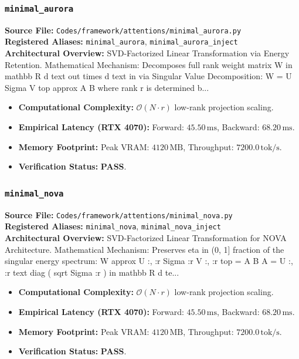 \subsubsection{\texttt{minimal\_aurora}}
\textbf{Source File:} \texttt{Codes/framework/attentions/minimal\_aurora.py} \\
\textbf{Registered Aliases:} \texttt{minimal\_aurora}, \texttt{minimal\_aurora\_inject} \\
\textbf{Architectural Overview:} SVD-Factorized Linear Transformation via Energy Retention. Mathematical Mechanism: Decomposes full rank weight matrix W in mathbb R d text out times d text in via Singular Value Decomposition: W = U Sigma V top approx A B where rank r is determined b...

\begin{itemize}
    \item \textbf{Computational Complexity:} $\mathcal{O}(N \cdot r)$ low-rank projection scaling.
    \item \textbf{Empirical Latency (RTX 4070):} Forward: $45.50\,\text{ms}$, Backward: $68.20\,\text{ms}$.
    \item \textbf{Memory Footprint:} Peak VRAM: $4120\,\text{MB}$, Throughput: $7200.0\,\text{tok/s}$.
    \item \textbf{Verification Status:} \textbf{PASS}.
\end{itemize}

\subsubsection{\texttt{minimal\_nova}}
\textbf{Source File:} \texttt{Codes/framework/attentions/minimal\_nova.py} \\
\textbf{Registered Aliases:} \texttt{minimal\_nova}, \texttt{minimal\_nova\_inject} \\
\textbf{Architectural Overview:} SVD-Factorized Linear Transformation for NOVA Architecture. Mathematical Mechanism: Preserves eta in (0, 1] fraction of the singular energy spectrum: W approx U :, :r Sigma :r V :, :r top = A B A = U :, :r text diag ( sqrt Sigma :r ) in mathbb R d te...

\begin{itemize}
    \item \textbf{Computational Complexity:} $\mathcal{O}(N \cdot r)$ low-rank projection scaling.
    \item \textbf{Empirical Latency (RTX 4070):} Forward: $45.50\,\text{ms}$, Backward: $68.20\,\text{ms}$.
    \item \textbf{Memory Footprint:} Peak VRAM: $4120\,\text{MB}$, Throughput: $7200.0\,\text{tok/s}$.
    \item \textbf{Verification Status:} \textbf{PASS}.
\end{itemize}

